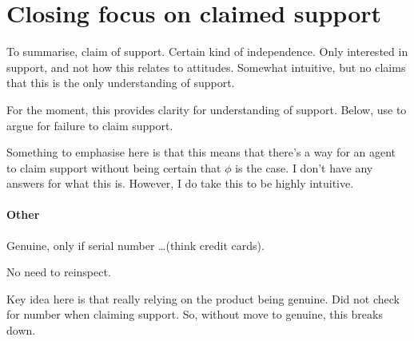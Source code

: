 


\section{Closing focus on claimed support}

\begin{note}
  To summarise, claim of support.
  Certain kind of independence.
  Only interested in support, and not how this relates to attitudes.
  Somewhat intuitive, but no claims that this is the only understanding of support.

  For the moment, this provides clarity for understanding of support.
  Below, use to argue for failure to claim support.
\end{note}

\begin{note}
  \color{red}
  Something to emphasise here is that this means that there's a way for an agent to claim support without being certain that \(\phi\) is the case.
  I don't have any answers for what this is.
  However, I do take this to be highly intuitive.
\end{note}

\paragraph{Other }

\begin{note}
  \begin{illustration}
    \label{illu:number-check}
    Genuine, only if serial number \dots (think credit cards).
  \end{illustration}
  No need to reinspect.

  Key idea here is that really relying on the product being genuine.
  Did not check for number when claiming support.
  So, without move to genuine, this breaks down.
\end{note}

